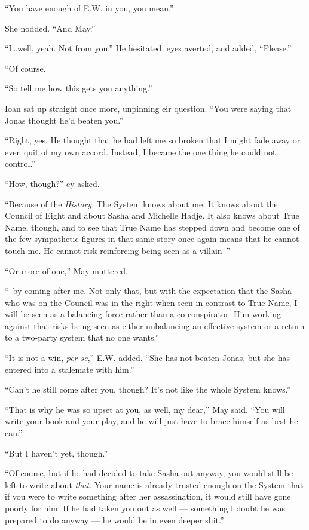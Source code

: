 ``You have enough of E.W. in you, you mean.''

She nodded. ``And May.''

``I\ldots well, yeah. Not from you.'' He hesitated, eyes averted, and added, ``Please.''

``Of course.

``So tell me how this gets you anything.''

Ioan sat up straight once more, unpinning eir question. ``You were saying that Jonas thought he'd beaten you.''

``Right, yes. He thought that he had left me so broken that I might fade away or even quit of my own accord. Instead, I became the one thing he could not control.''

``How, though?'' ey asked.

``Because of the \emph{History}. The System knows about me. It knows about the Council of Eight and about Sasha and Michelle Hadje. It also knows about True Name, though, and to see that True Name has stepped down and become one of the few sympathetic figures in that same story once again means that he cannot touch me. He cannot risk reinforcing being seen as a villain--''

``Or more of one,'' May muttered.

``--by coming after me. Not only that, but with the expectation that the Sasha who was on the Council was in the right when seen in contrast to True Name, I will be seen as a balancing force rather than a co-conspirator. Him working against that risks being seen as either unbalancing an effective system or a return to a two-party system that no one wants.''

``It is not a win, \emph{per se},'' E.W. added. ``She has not beaten Jonas, but she has entered into a stalemate with him.''

``Can't he still come after you, though? It's not like the whole System knows.''

``That is why he was so upset at you, as well, my dear,'' May said. ``You will write your book and your play, and he will just have to brace himself as best he can.''

``But I haven't yet, though.''

``Of course, but if he had decided to take Sasha out anyway, you would still be left to write about \emph{that}. Your name is already trusted enough on the System that if you were to write something after her assassination, it would still have gone poorly for him. If he had taken you out as well — something I doubt he was prepared to do anyway — he would be in even deeper shit.''


